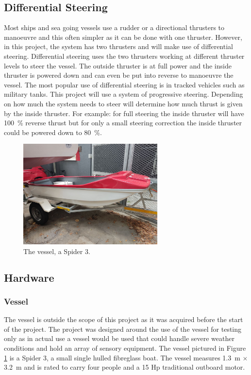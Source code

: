 	\subsection{Differential Steering} 
	Most ships and sea going vessels use a rudder or a directional thrusters to manoeuvre and this often simpler as it can be done with one thruster. However, in this project, the system has two thrusters and will make use of differential steering. Differential steering uses the two thrusters working at different thruster levels to steer the vessel. The outside thruster is at full power and the inside thruster is powered down and can even be put into reverse to manoeuvre the vessel. The most popular use of differential steering is in tracked vehicles such as military tanks. This project will use a system of progressive steering. Depending on how much the system needs to steer will determine how much thrust is given by the inside thruster. For example: for full steering the inside thruster will have \SI{100}{\percent} reverse thrust but for only a small steering correction the inside thruster could be powered down to \SI{80}{\percent}.
\begin{figure}
	\begin{center}
		\includegraphics[width = 0.65\textwidth]{figures/spider3.jpg}
		\caption{The vessel, a Spider 3.}
		\label{fig:3:spider}
	\end{center}
\end{figure}
	\subsection{Hardware}\par
		\subsubsection{Vessel}
		The vessel is outside the scope of this project as it was acquired before the start of the project. The project was designed around the use of the vessel for testing only as in actual use a vessel would be used that could handle severe weather conditions and hold an array of sensory equipment. The vessel pictured in Figure \ref{fig:3:spider} is a Spider 3, a small single hulled fibreglass boat. The vessel measures \SI{1.3}{\meter} $\times$ \SI{3.2}{\meter} and is rated to carry four people and a 15 Hp traditional outboard motor.\par

